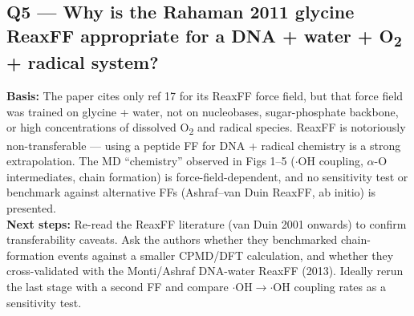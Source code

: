 \subsection*{Q5 --- Why is the Rahaman 2011 glycine ReaxFF appropriate for a DNA + water + O\textsubscript{2} + radical system?}
\textbf{Basis:} The paper cites only ref 17 for its ReaxFF force field, but that force field was trained on glycine + water, not on nucleobases, sugar-phosphate backbone, or high concentrations of dissolved O\textsubscript{2} and radical species. ReaxFF is notoriously non-transferable --- using a peptide FF for DNA + radical chemistry is a strong extrapolation. The MD ``chemistry'' observed in Figs 1--5 ($\cdot$OH coupling, $\alpha$-O intermediates, chain formation) is force-field-dependent, and no sensitivity test or benchmark against alternative FFs (Ashraf--van Duin ReaxFF, ab initio) is presented.\\
\textbf{Next steps:} Re-read the ReaxFF literature (van Duin 2001 onwards) to confirm transferability caveats. Ask the authors whether they benchmarked chain-formation events against a smaller CPMD/DFT calculation, and whether they cross-validated with the Monti/Ashraf DNA-water ReaxFF (2013). Ideally rerun the last stage with a second FF and compare $\cdot$OH$\to\cdot$OH coupling rates as a sensitivity test.
